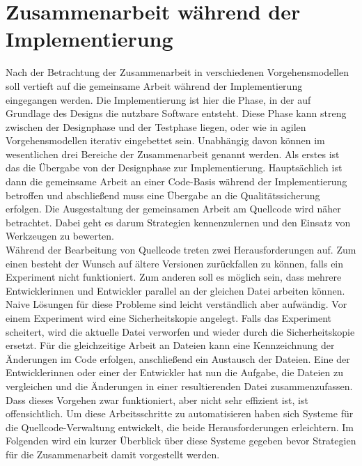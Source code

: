 
\section{Zusammenarbeit während der Implementierung}
\label{sec:implementierung}

Nach der Betrachtung der Zusammenarbeit in verschiedenen Vorgehensmodellen soll vertieft auf die gemeinsame Arbeit während der Implementierung eingegangen werden. Die Implementierung ist hier die Phase, in der auf Grundlage des Designs die nutzbare Software entsteht. Diese Phase kann streng zwischen der Designphase und der Testphase liegen, oder wie in agilen Vorgehensmodellen iterativ eingebettet sein. Unabhängig davon können im wesentlichen drei Bereiche der Zusammenarbeit genannt werden. Als erstes ist das die Übergabe von der Designphase zur Implementierung. Hauptsächlich ist dann die gemeinsame Arbeit an einer Code-Basis während der Implementierung betroffen und abschließend muss eine Übergabe an die Qualitätssicherung erfolgen.
Die Ausgestaltung der gemeinsamen Arbeit am Quellcode wird näher betrachtet. Dabei geht es darum Strategien kennenzulernen und den Einsatz von Werkzeugen zu bewerten.
\\
Während der Bearbeitung von Quellcode treten zwei Herausforderungen auf. Zum einen besteht der Wunsch auf ältere Versionen zurückfallen zu können, falls ein Experiment nicht funktioniert. Zum anderen soll es möglich sein, dass mehrere Entwicklerinnen und Entwickler parallel an der gleichen Datei arbeiten können. Naive Lösungen für diese Probleme sind leicht verständlich aber aufwändig. Vor einem Experiment wird eine Sicherheitskopie angelegt. Falls das Experiment scheitert, wird die aktuelle Datei verworfen und wieder durch die Sicherheitskopie ersetzt. Für die gleichzeitige Arbeit an Dateien kann eine Kennzeichnung der Änderungen im Code erfolgen, anschließend ein Austausch der Dateien. Eine der Entwicklerinnen oder einer der Entwickler hat nun die Aufgabe, die Dateien zu vergleichen und die Änderungen in einer resultierenden Datei zusammenzufassen. 
\\
Dass dieses Vorgehen zwar funktioniert, aber nicht sehr effizient ist, ist offensichtlich. Um diese Arbeitsschritte zu automatisieren haben sich Systeme für die Quellcode-Verwaltung entwickelt, die beide Herausforderungen erleichtern. Im Folgenden wird ein kurzer Überblick über diese Systeme gegeben bevor Strategien für die Zusammenarbeit damit vorgestellt werden.


